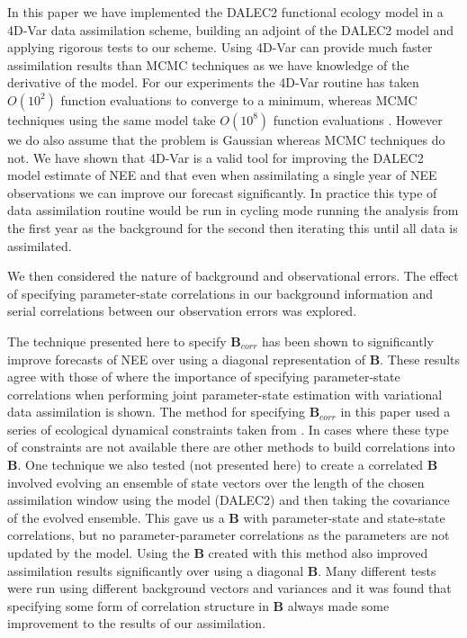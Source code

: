 \documentclass[11pt]{article}
\begin{document}
In this paper we have implemented the DALEC2 functional ecology model in a 4D-Var data assimilation scheme, building an adjoint of the DALEC2 model and applying rigorous tests to our scheme. Using 4D-Var can provide much faster assimilation results than MCMC techniques as we have knowledge of the derivative of the model. For our experiments the 4D-Var routine has taken $O(10^{2})$ function evaluations to converge to a minimum, whereas MCMC techniques using the same model take $O(10^{8})$ function evaluations \citep{Bloom2015}. However we do also assume that the problem is Gaussian whereas MCMC techniques do not. We have shown that 4D-Var is a valid tool for improving the DALEC2 model estimate of NEE and that even when assimilating a single year of NEE observations we can improve our forecast significantly. In practice this type of data assimilation routine would be run in cycling mode running the analysis from the first year as the background for the second then iterating this until all data is assimilated.

We then considered the nature of background and observational errors. The effect of specifying parameter-state correlations in our background information and serial correlations between our observation errors was explored.

The technique presented here to specify ${\mathbf{B}}_{corr}$ has been shown to significantly improve forecasts of NEE over using a diagonal representation of ${\mathbf{B}}$. These results agree with those of \citet{smith2009variational} where the importance of specifying parameter-state correlations when performing joint parameter-state estimation with variational data assimilation is shown. The method for specifying ${\mathbf{B}}_{corr}$ in this paper used a series of ecological dynamical constraints taken from \citet{Bloom2015}. In cases where these type of constraints are not available there are other methods to build correlations into $\textbf{B}$. One technique we also tested (not presented here) to create a correlated $\textbf{B}$ involved evolving an ensemble of state vectors over the length of the chosen assimilation window using the model (DALEC2) and then taking the covariance of the evolved ensemble. This gave us a \textbf{B} with parameter-state and state-state correlations, but no parameter-parameter correlations as the parameters are not updated by the model. Using the $\textbf{B}$ created with this method also improved assimilation results significantly over using a diagonal $\textbf{B}$. Many different tests were run using different background vectors and variances and it was found that specifying some form of correlation structure in $\textbf{B}$ always made some improvement to the results of our assimilation.
\end{document}
